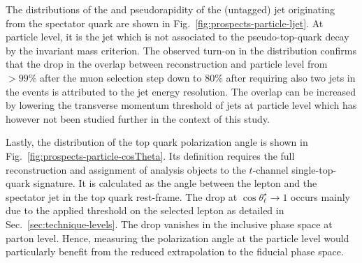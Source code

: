 The distributions of the \pt and pseudorapidity of the (untagged) jet originating from the spectator quark are shown in Fig.~\ref{fig:prospects-particle-ljet}. 
At particle level, it is the jet which is not associated to the pseudo-top-quark decay by the invariant mass criterion. 
The observed turn-on in the \pt distribution confirms that the drop in the overlap between reconstruction and particle level from $>99\%$ after the muon selection step down to 80\% after requiring also two jets in the events is attributed to the jet energy resolution. The overlap can be increased by lowering the transverse momentum threshold of jets at particle level which has however not been studied further in the context of this study.


Lastly, the distribution of the top quark polarization angle is shown in Fig.~\ref{fig:prospects-particle-cosTheta}. Its definition requires the full reconstruction and assignment of analysis objects to the $t$-channel single-top-quark signature. It is calculated as the angle between the lepton and the spectator jet in the top quark rest-frame. 
The drop at $\cos\theta_\ell^\star\to1$ occurs mainly due to the applied \pt threshold on the selected lepton as detailed in Sec.~\ref{sec:technique-levels}. The drop vanishes in the inclusive phase space at parton level. Hence, measuring the polarization angle at the particle level would particularly benefit from the reduced extrapolation to the fiducial phase space.

